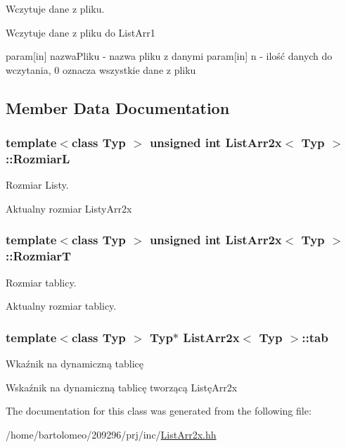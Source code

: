 Wczytuje dane z pliku. 

Wczytuje dane z pliku do List\-Arr1

param\mbox{[}in\mbox{]} nazwa\-Pliku -\/ nazwa pliku z danymi param\mbox{[}in\mbox{]} n -\/ ilość danych do wczytania, 0 oznacza wszystkie dane z pliku 

\subsection{Member Data Documentation}
\hypertarget{class_list_arr2x_abc3468541635f4153c24b76ef573cd65}{
\subsubsection[{Rozmiar\-L}]{\setlength{\rightskip}{0pt plus 5cm}template$<$class Typ $>$ unsigned int {\bf List\-Arr2x}$<$ Typ $>$\-::Rozmiar\-L\hspace{0.3cm}{\ttfamily [private]}}}\label{class_list_arr2x_abc3468541635f4153c24b76ef573cd65}


Rozmiar Listy. 

Aktualny rozmiar Listy\-Arr2x \hypertarget{class_list_arr2x_ac414e40eb15aaa95be5fe2c534a9a8b7}{
\subsubsection[{Rozmiar\-T}]{\setlength{\rightskip}{0pt plus 5cm}template$<$class Typ $>$ unsigned int {\bf List\-Arr2x}$<$ Typ $>$\-::Rozmiar\-T\hspace{0.3cm}{\ttfamily [private]}}}\label{class_list_arr2x_ac414e40eb15aaa95be5fe2c534a9a8b7}


Rozmiar tablicy. 

Aktualny rozmiar tablicy. \hypertarget{class_list_arr2x_a6079e03d75b837d563aac676b80a9da2}{
\subsubsection[{tab}]{\setlength{\rightskip}{0pt plus 5cm}template$<$class Typ $>$ Typ$\ast$ {\bf List\-Arr2x}$<$ Typ $>$\-::tab\hspace{0.3cm}{\ttfamily [private]}}}\label{class_list_arr2x_a6079e03d75b837d563aac676b80a9da2}


Wkaźnik na dynamiczną tablicę 

Wskaźnik na dynamiczną tablicę tworzącą Listę\-Arr2x 

The documentation for this class was generated from the following file\-:\begin{DoxyCompactItemize}
\item 
/home/bartolomeo/209296/prj/inc/\hyperlink{_list_arr2x_8hh}{List\-Arr2x.\-hh}\end{DoxyCompactItemize}
